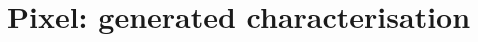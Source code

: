 \documentclass[11pt]{article}
\begin{document}
\section*{Pixel: generated characterisation}

\end{document}
